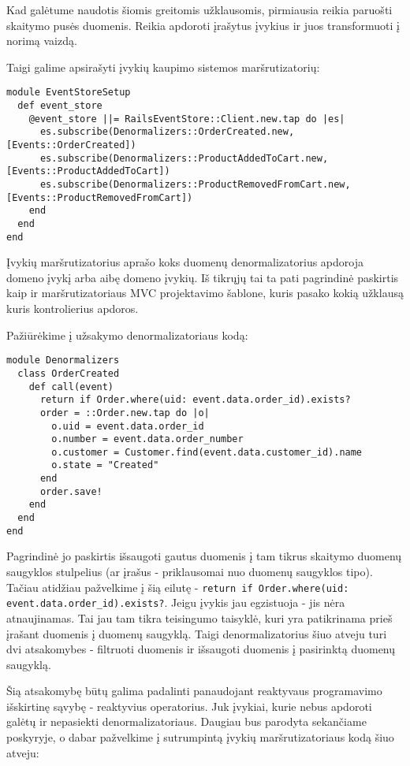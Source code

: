 Kad galėtume naudotis šiomis greitomis užklausomis, pirmiausia reikia paruošti skaitymo pusės duomenis. Reikia apdoroti įrašytus įvykius ir juos transformuoti į norimą vaizdą.

Taigi galime apsirašyti įvykių kaupimo sistemos maršrutizatorių:

\begin{lstlisting}
module EventStoreSetup
  def event_store
    @event_store ||= RailsEventStore::Client.new.tap do |es|
      es.subscribe(Denormalizers::OrderCreated.new, [Events::OrderCreated])
      es.subscribe(Denormalizers::ProductAddedToCart.new, [Events::ProductAddedToCart])
      es.subscribe(Denormalizers::ProductRemovedFromCart.new, [Events::ProductRemovedFromCart])
    end
  end
end
\end{lstlisting}

Įvykių maršrutizatorius aprašo koks duomenų denormalizatorius apdoroja domeno įvykį arba aibę domeno įvykių. Iš tikrųjų tai ta pati pagrindinė paskirtis kaip ir maršrutizatoriaus MVC projektavimo šablone, kuris pasako kokią užklausą kuris kontrolierius apdoros.

Pažiūrėkime į užsakymo denormalizatoriaus kodą:

\begin{lstlisting}
module Denormalizers
  class OrderCreated
    def call(event)
      return if Order.where(uid: event.data.order_id).exists?
      order = ::Order.new.tap do |o|
        o.uid = event.data.order_id
        o.number = event.data.order_number
        o.customer = Customer.find(event.data.customer_id).name
        o.state = "Created"
      end
      order.save!
    end
  end
end
\end{lstlisting}

Pagrindinė jo paskirtis išsaugoti gautus duomenis į tam tikrus skaitymo duomenų saugyklos stulpelius (ar įrašus - priklausomai nuo duomenų saugyklos tipo). Tačiau atidžiau pažvelkime į šią eilutę - \lstinline|return if Order.where(uid: event.data.order_id).exists?|. Jeigu įvykis jau egzistuoja - jis nėra atnaujinamas. Tai jau tam tikra teisingumo taisyklė, kuri yra patikrinama prieš įrašant duomenis į duomenų saugyklą. Taigi denormalizatorius šiuo atveju turi dvi atsakomybes - filtruoti duomenis ir išsaugoti duomenis į pasirinktą duomenų saugyklą.

Šią atsakomybę būtų galima padalinti panaudojant reaktyvaus programavimo išskirtinę sąvybę - reaktyvius operatorius. Juk įvykiai, kurie nebus apdoroti galėtų ir nepasiekti denormalizatoriaus. Daugiau bus parodyta sekančiame poskyryje, o dabar pažvelkime į sutrumpintą įvykių maršrutizatoriaus kodą šiuo atveju:

